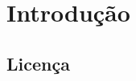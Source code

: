 \documentclass[report]{uftex}
\begin{document}
\chapter{Introdução}
\label{sec:introducao}
\noindent 
\lipsum[1]

\section{Licença}
\label{sec:Licenca}

\noindent 
\lipsum[1]

\backmatter 
\singlespacing   %


\appendix
\end{document}
